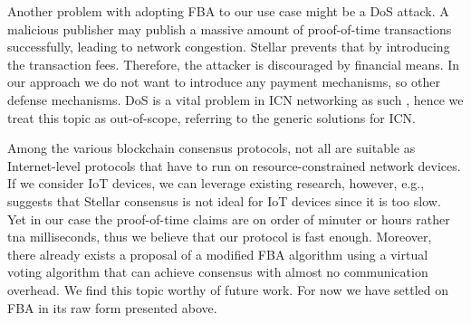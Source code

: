 Another problem with adopting FBA to our use case might be a DoS attack. A malicious publisher may publish a massive amount of proof-of-time transactions successfully, leading to network congestion. Stellar prevents that by introducing the transaction fees. Therefore, the attacker is discouraged by financial means. In our approach we do not want to introduce any payment mechanisms, so other defense mechanisms. DoS is a vital problem in ICN networking as such \cite{gasti2013and}, hence we treat this topic as out-of-scope, referring to the generic solutions for ICN.

Among the various blockchain consensus protocols, not all are suitable as Internet-level protocols that have to run on resource-constrained network devices.
If we consider IoT devices, we can leverage existing research, however, e.g., \cite{salimitari2018survey} suggests that Stellar consensus is not ideal for IoT devices since it is too slow.
Yet in our case the proof-of-time claims are on order of minuter or hours rather tna milliseconds, thus we believe that our protocol is fast enough.
Moreover, there already exists a proposal of a modified FBA algorithm using a virtual voting algorithm \cite{FCPpdf50:online} that can achieve consensus with almost no communication overhead. We find this topic worthy of future work. For now we have settled on FBA in its raw form presented above.




